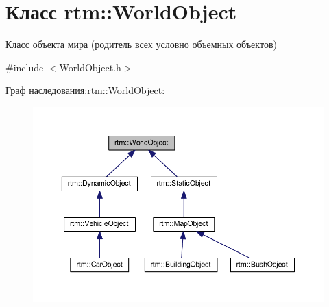 \hypertarget{classrtm_1_1_world_object}{}\section{Класс rtm\+:\+:World\+Object}
\label{classrtm_1_1_world_object}


Класс объекта мира (родитель всех условно объемных объектов)  




{\ttfamily \#include $<$World\+Object.\+h$>$}



Граф наследования\+:rtm\+:\+:World\+Object\+:
\nopagebreak
\begin{figure}[H]
\begin{center}
\leavevmode
\includegraphics[width=350pt]{classrtm_1_1_world_object__inherit__graph}
\end{center}
\end{figure}
